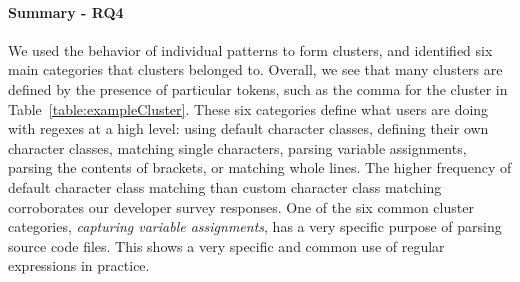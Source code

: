 \paragraph{Summary - RQ4}
We used the behavior of individual patterns to form clusters, and identified six main categories that clusters belonged to.  Overall, we see that many clusters are defined by the presence of particular tokens, such as the comma for the cluster in Table~\ref{table:exampleCluster}.
These six categories define what users are doing with regexes at a high level: using default character classes, defining their own character classes, matching single characters, parsing variable assignments, parsing the contents of brackets, or matching whole lines. The higher frequency of default character class matching than custom character class matching corroborates our developer survey responses.
 One of the six common cluster categories, \emph{capturing variable assignments}, has a very specific purpose of parsing source code files. This shows a very specific and common use of regular expressions in practice.


%
%
%
%














